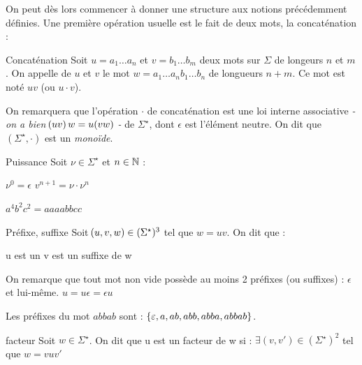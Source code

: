     On peut dès lors commencer à donner une structure aux notions précédemment définies. Une première opération usuelle est le fait de  deux mots, \ie la concaténation :
    
    \begin{definition}{Concaténation}{}
        Soit $u = a_1\dots a_n$ et $v = b_1\dots b_m$ deux mots sur $\Sigma$ de longeurs $n$ et $m$. On appelle  de $u$ et $v$ le mot $w = a_1\dots a_nb_1 \dots b_n$ de longueurs $n + m$. Ce mot est noté $uv$ (ou $u \cdot v$).
    \end{definition}{}{}  
    
    On remarquera que l'opération $\cdot$ de concaténation est une loi interne associative \textit{- on a bien $\!\left(uv\right)w = u\!\left(vw\right)$ -} de $\Sigma^\star$, dont $\epsilon$ est l'élément neutre. On dit que $(\Sigma^\star, \cdot)$ est un \textit{monoïde}.
    
    
    \begin{definition}{Puissance}{}
        Soit $\nu \in \Sigma^\star$ et $n \in \mathbb{N}$ :
        \begin{enumerate}
            \itt $\nu^0 = \epsilon$
            \itt $v^{n+1} = \nu \cdot \nu^n$
        \end{enumerate}
    \end{definition}
    
    \begin{example}{}{}
        $a^4b^2c^2 = a a a a b b c c$
    \end{example}
    
    \begin{definition}{Préfixe, suffixe}{}
        Soit $\!\left(u, v, w\right) \in (\Sigma^\star)^3$ tel que $w=uv$. On dit que :
        \begin{enumerate}
            \itt u est un 
            \itt v est un suffixe de w
        \end{enumerate}
    \end{definition}
    
    On remarque que tout mot non vide possède au moins 2 préfixes (ou suffixes) : $\epsilon$ et lui-même. $u = u\epsilon = \epsilon u$
    
    \begin{example}{}{}
        Les préfixes du mot $abbab$ sont : $\left\{\varepsilon, a, ab, abb, abba, abbab\right\}$.
    \end{example}
    
    \begin{definition}{facteur}{}
        Soit $w \in \Sigma^\star$.
        On dit que u est un facteur de w si :
        $\exists (v,v') \in (\Sigma^\star)^2$ tel que $w = v u v'$
        
    \end{definition}
    
